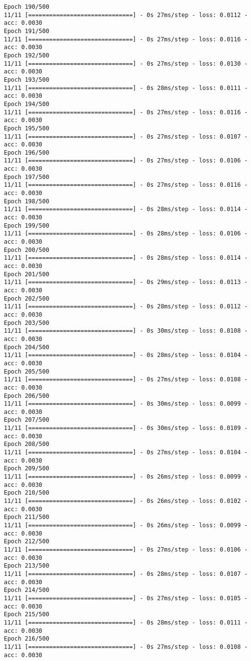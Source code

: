 \documentclass[11pt]{article}
\begin{document}
\begin{Verbatim}[commandchars=\\\{\}]
Epoch 190/500
11/11 [==============================] - 0s 27ms/step - loss: 0.0112 - acc: 0.0030
Epoch 191/500
11/11 [==============================] - 0s 27ms/step - loss: 0.0116 - acc: 0.0030
Epoch 192/500
11/11 [==============================] - 0s 27ms/step - loss: 0.0130 - acc: 0.0030
Epoch 193/500
11/11 [==============================] - 0s 28ms/step - loss: 0.0111 - acc: 0.0030
Epoch 194/500
11/11 [==============================] - 0s 27ms/step - loss: 0.0116 - acc: 0.0030
Epoch 195/500
11/11 [==============================] - 0s 27ms/step - loss: 0.0107 - acc: 0.0030
Epoch 196/500
11/11 [==============================] - 0s 27ms/step - loss: 0.0106 - acc: 0.0030
Epoch 197/500
11/11 [==============================] - 0s 27ms/step - loss: 0.0116 - acc: 0.0030
Epoch 198/500
11/11 [==============================] - 0s 28ms/step - loss: 0.0114 - acc: 0.0030
Epoch 199/500
11/11 [==============================] - 0s 28ms/step - loss: 0.0106 - acc: 0.0030
Epoch 200/500
11/11 [==============================] - 0s 28ms/step - loss: 0.0114 - acc: 0.0030
Epoch 201/500
11/11 [==============================] - 0s 29ms/step - loss: 0.0113 - acc: 0.0030
Epoch 202/500
11/11 [==============================] - 0s 28ms/step - loss: 0.0112 - acc: 0.0030
Epoch 203/500
11/11 [==============================] - 0s 30ms/step - loss: 0.0108 - acc: 0.0030
Epoch 204/500
11/11 [==============================] - 0s 28ms/step - loss: 0.0104 - acc: 0.0030
Epoch 205/500
11/11 [==============================] - 0s 27ms/step - loss: 0.0108 - acc: 0.0030
Epoch 206/500
11/11 [==============================] - 0s 30ms/step - loss: 0.0099 - acc: 0.0030
Epoch 207/500
11/11 [==============================] - 0s 30ms/step - loss: 0.0109 - acc: 0.0030
Epoch 208/500
11/11 [==============================] - 0s 27ms/step - loss: 0.0104 - acc: 0.0030
Epoch 209/500
11/11 [==============================] - 0s 26ms/step - loss: 0.0099 - acc: 0.0030
Epoch 210/500
11/11 [==============================] - 0s 26ms/step - loss: 0.0102 - acc: 0.0030
Epoch 211/500
11/11 [==============================] - 0s 26ms/step - loss: 0.0099 - acc: 0.0030
Epoch 212/500
11/11 [==============================] - 0s 27ms/step - loss: 0.0106 - acc: 0.0030
Epoch 213/500
11/11 [==============================] - 0s 28ms/step - loss: 0.0107 - acc: 0.0030
Epoch 214/500
11/11 [==============================] - 0s 27ms/step - loss: 0.0105 - acc: 0.0030
Epoch 215/500
11/11 [==============================] - 0s 28ms/step - loss: 0.0111 - acc: 0.0030
Epoch 216/500
11/11 [==============================] - 0s 27ms/step - loss: 0.0108 - acc: 0.0030

\end{Verbatim}
\end{document}
